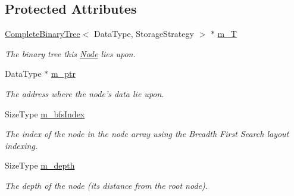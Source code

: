 \subsection*{Protected Attributes}
\begin{DoxyCompactItemize}
\item 
\hypertarget{class_complete_binary_tree_1_1_node_addd3893923d5e5cff2b3871e57f5f0c1}{
\hyperlink{class_complete_binary_tree}{CompleteBinaryTree}$<$ DataType, StorageStrategy $>$ $\ast$ \hyperlink{class_complete_binary_tree_1_1_node_addd3893923d5e5cff2b3871e57f5f0c1}{m\_\-T}}
\label{class_complete_binary_tree_1_1_node_addd3893923d5e5cff2b3871e57f5f0c1}

\begin{DoxyCompactList}\small\item\em The binary tree this \hyperlink{class_complete_binary_tree_1_1_node}{Node} lies upon. \item\end{DoxyCompactList}\item 
\hypertarget{class_complete_binary_tree_1_1_node_aca3a426702b4e1e5f687b0fe44a65e89}{
DataType $\ast$ \hyperlink{class_complete_binary_tree_1_1_node_aca3a426702b4e1e5f687b0fe44a65e89}{m\_\-ptr}}
\label{class_complete_binary_tree_1_1_node_aca3a426702b4e1e5f687b0fe44a65e89}

\begin{DoxyCompactList}\small\item\em The address where the node's data lie upon. \item\end{DoxyCompactList}\item 
\hypertarget{class_complete_binary_tree_1_1_node_a1c301e0188c93eb728d145575ac495bd}{
SizeType \hyperlink{class_complete_binary_tree_1_1_node_a1c301e0188c93eb728d145575ac495bd}{m\_\-bfsIndex}}
\label{class_complete_binary_tree_1_1_node_a1c301e0188c93eb728d145575ac495bd}

\begin{DoxyCompactList}\small\item\em The index of the node in the node array using the Breadth First Search layout indexing. \item\end{DoxyCompactList}\item 
\hypertarget{class_complete_binary_tree_1_1_node_a494f9a365fbcaeb2a1eafdf4e5c15478}{
SizeType \hyperlink{class_complete_binary_tree_1_1_node_a494f9a365fbcaeb2a1eafdf4e5c15478}{m\_\-depth}}
\label{class_complete_binary_tree_1_1_node_a494f9a365fbcaeb2a1eafdf4e5c15478}

\begin{DoxyCompactList}\small\item\em The depth of the node (its distance from the root node). \item\end{DoxyCompactList}\end{DoxyCompactItemize}


